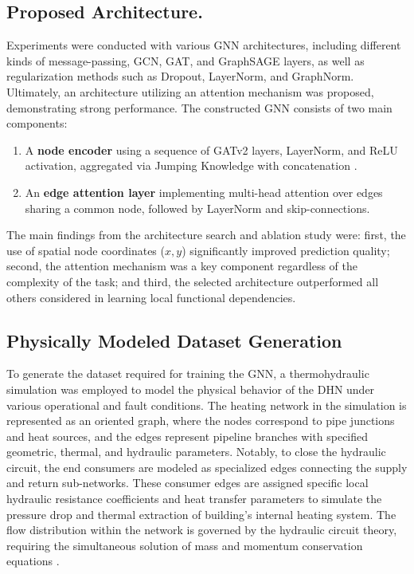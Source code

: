 \documentclass[energies,article,submit,pdftex,moreauthors]{Definitions/mdpi}
\begin{document}
\subsection{Proposed Architecture.} Experiments were conducted with various GNN architectures, including different
kinds of message-passing, GCN, GAT, and GraphSAGE \cite{hamilton2017inductive,
	kipf2017semisupervisedclassificationgraphconvolutional,
	veličković2018graphattentionnetworks} layers, as well as regularization methods
such as Dropout, LayerNorm, and GraphNorm. Ultimately, an architecture
utilizing an attention mechanism was proposed, demonstrating strong
performance. The constructed GNN consists of two main components:

\begin{enumerate}
	\item A \textbf{node encoder} using a sequence of GATv2 layers, LayerNorm, and ReLU
	      activation, aggregated via Jumping Knowledge with concatenation
	      \cite{brody2021attentive, xu2018representationlearninggraphsjumping}.
	\item An \textbf{edge attention layer} implementing multi-head attention over edges
	      sharing a common node, followed by LayerNorm and skip-connections.
\end{enumerate}

The main findings from the architecture search and ablation study were: first,
the use of spatial node coordinates ($x,y$) significantly improved prediction
quality; second, the attention mechanism was a key component regardless of the
complexity of the task; and third, the selected architecture outperformed all
others considered in learning local functional dependencies.

\subsection{Physically Modeled Dataset Generation}
To generate the dataset required for training the GNN, a thermohydraulic
simulation was employed to model the physical behavior of the DHN under various
operational and fault conditions. The heating network in the simulation is
represented as an oriented graph, where the nodes correspond to pipe junctions
and heat sources, and the edges represent pipeline branches with specified
geometric, thermal, and hydraulic parameters. Notably, to close the hydraulic
circuit, the end consumers are modeled as specialized edges connecting the
supply and return sub-networks. These consumer edges are assigned specific
local hydraulic resistance coefficients and heat transfer parameters to
simulate the pressure drop and thermal extraction of building's internal
heating system. The flow distribution within the network is governed by the
hydraulic circuit theory, requiring the simultaneous solution of mass and
momentum conservation equations \cite{vesterlund2015method}.
\end{document}
